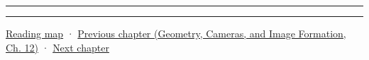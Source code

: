 \begin{center}\rule{0.5\linewidth}{0.5pt}\end{center}

\begin{center}\rule{0.5\linewidth}{0.5pt}\end{center}

\hyperref[volume-reading-map]{Reading map} · \href{../03-Geometry-Cameras-and-Image-Formation/main.pdf\#nameddest=03-visual-computing-i-ch013-from-view-space-to-clip-space}{Previous chapter (Geometry, Cameras, and Image Formation, Ch. 12)} · \hyperref[03-visual-computing-i-ch015-rasterization-foundations-and-renderer-evidence]{Next chapter}
